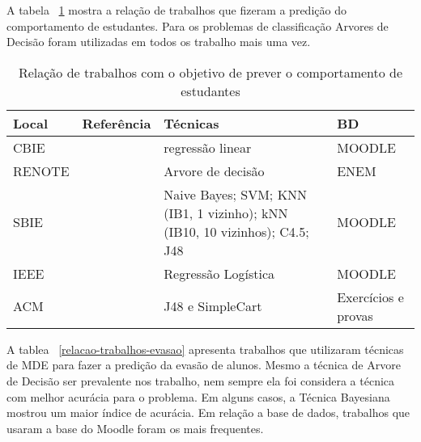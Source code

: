\documentclass[ti]{texufpel} %
\begin{document}
A tabela ~\ref{relacao-trabalhos-comportamento} mostra a relação de trabalhos que fizeram a predição do comportamento de estudantes. Para os problemas de classificação Arvores de Decisão foram utilizadas em todos os trabalho mais uma vez.


\begin{table}
\begin{center}
\caption{Relação de trabalhos com o objetivo de prever o comportamento de estudantes}\label{relacao-trabalhos-comportamento}
\begin{tabular}{p{1.4cm}|p{7cm}|p{4cm}|p{1.5cm}}
\hline
Local & Referência & Técnicas & BD \\
\hline
{\small CBIE} & {\small\em \citet{de2016mineraccao}} & {\small regressão linear} & {\small MOODLE} \\
{\small RENOTE} & {\small\em \citet{santos13evidencia}} & {\small Arvore de decisão} & {\small ENEM} \\
{\small SBIE} & {\small\em \citet{ramos2017modelo}} & {\small Naive Bayes; SVM; KNN (IB1, 1 vizinho); kNN (IB10, 10 vizinhos); C4.5; J48} & {\small MOODLE} \\
{\small IEEE} & {\small\em \citet{grivokostopoulou2014utilizing}} & {\small Regressão Logística} & {\small MOODLE} \\
{\small ACM} & {\small\em \citet{ahadi2015exploring}} & {\small J48 e SimpleCart} & {\small Exercícios e provas} \\
\hline
\end{tabular}
\end{center}
\end{table}

A tablea ~\ref{relacao-trabalhos-evasao} apresenta trabalhos que utilizaram técnicas de MDE para fazer a predição da evasão de alunos. Mesmo a técnica de Arvore de Decisão ser prevalente nos trabalho, nem sempre ela foi considera a técnica com melhor acurácia para o problema. Em alguns casos, a Técnica Bayesiana mostrou um maior índice de acurácia. Em relação a base de dados, trabalhos que usaram a base do Moodle foram os mais frequentes.
\end{document}
